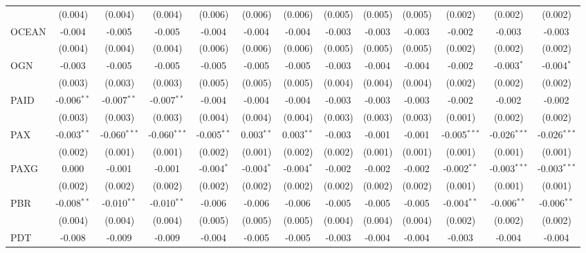 \begin{table}[!htbp]
\begin{tabular}{@{\extracolsep{5pt}}lcccccccccccc}
  & (0.004) & (0.004) & (0.004) & (0.006) & (0.006) & (0.006) & (0.005) & (0.005) & (0.005) & (0.002) & (0.002) & (0.002) \\
 OCEAN & -0.004$^{}$ & -0.005$^{}$ & -0.005$^{}$ & -0.004$^{}$ & -0.004$^{}$ & -0.004$^{}$ & -0.003$^{}$ & -0.003$^{}$ & -0.003$^{}$ & -0.002$^{}$ & -0.003$^{}$ & -0.003$^{}$ \\
  & (0.004) & (0.004) & (0.004) & (0.006) & (0.006) & (0.006) & (0.005) & (0.005) & (0.005) & (0.002) & (0.002) & (0.002) \\
 OGN & -0.003$^{}$ & -0.005$^{}$ & -0.005$^{}$ & -0.005$^{}$ & -0.005$^{}$ & -0.005$^{}$ & -0.003$^{}$ & -0.004$^{}$ & -0.004$^{}$ & -0.002$^{}$ & -0.003$^{*}$ & -0.004$^{*}$ \\
  & (0.003) & (0.003) & (0.003) & (0.005) & (0.005) & (0.005) & (0.004) & (0.004) & (0.004) & (0.002) & (0.002) & (0.002) \\
 PAID & -0.006$^{**}$ & -0.007$^{**}$ & -0.007$^{**}$ & -0.004$^{}$ & -0.004$^{}$ & -0.004$^{}$ & -0.003$^{}$ & -0.003$^{}$ & -0.003$^{}$ & -0.002$^{}$ & -0.002$^{}$ & -0.002$^{}$ \\
  & (0.003) & (0.003) & (0.003) & (0.004) & (0.004) & (0.004) & (0.003) & (0.003) & (0.003) & (0.001) & (0.002) & (0.002) \\
 PAX & -0.003$^{**}$ & -0.060$^{***}$ & -0.060$^{***}$ & -0.005$^{**}$ & 0.003$^{**}$ & 0.003$^{**}$ & -0.003$^{}$ & -0.001$^{}$ & -0.001$^{}$ & -0.005$^{***}$ & -0.026$^{***}$ & -0.026$^{***}$ \\
  & (0.002) & (0.001) & (0.001) & (0.002) & (0.001) & (0.002) & (0.002) & (0.001) & (0.001) & (0.001) & (0.001) & (0.001) \\
 PAXG & 0.000$^{}$ & -0.001$^{}$ & -0.001$^{}$ & -0.004$^{*}$ & -0.004$^{*}$ & -0.004$^{*}$ & -0.002$^{}$ & -0.002$^{}$ & -0.002$^{}$ & -0.002$^{**}$ & -0.003$^{***}$ & -0.003$^{***}$ \\
  & (0.002) & (0.002) & (0.002) & (0.002) & (0.002) & (0.002) & (0.002) & (0.002) & (0.002) & (0.001) & (0.001) & (0.001) \\
 PBR & -0.008$^{**}$ & -0.010$^{**}$ & -0.010$^{**}$ & -0.006$^{}$ & -0.006$^{}$ & -0.006$^{}$ & -0.005$^{}$ & -0.005$^{}$ & -0.005$^{}$ & -0.004$^{**}$ & -0.006$^{**}$ & -0.006$^{**}$ \\
  & (0.004) & (0.004) & (0.004) & (0.005) & (0.005) & (0.005) & (0.004) & (0.004) & (0.004) & (0.002) & (0.002) & (0.002) \\
 PDT & -0.008$^{}$ & -0.009$^{}$ & -0.009$^{}$ & -0.004$^{}$ & -0.005$^{}$ & -0.005$^{}$ & -0.003$^{}$ & -0.004$^{}$ & -0.004$^{}$ & -0.003$^{}$ & -0.004$^{}$ & -0.004$^{}$ \\

\end{tabular}
\end{table}
